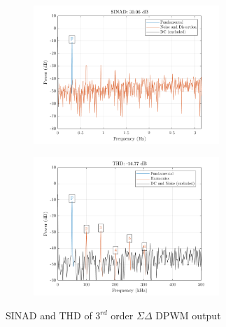\documentclass[11pt,a4paper]{article}
\begin{document}
\begin{figure}[H]
	\centering
	\begin{subfigure}[b]{0.45\textwidth}
		\centering
		\includegraphics[width=70mm]{images/sinad3order.png}
		\label{sinad3}
	\end{subfigure}
	\begin{subfigure}[b]{0.45\textwidth}
		\centering
		\includegraphics[width=70mm]{images/pwm3thd.png}
		\label{thd3}
	\end{subfigure}
	\caption{SINAD and THD of $3^{rd}$ order $\Sigma\Delta$ DPWM output}
	\label{sinadthd}
\end{figure}
\end{document}
